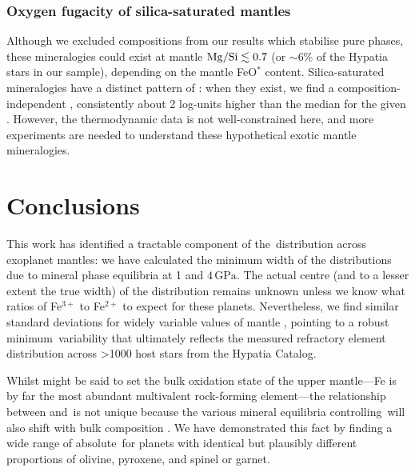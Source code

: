 \subsubsection{Oxygen fugacity of silica-saturated mantles}\label{sec:discussion-sio2}

Although we excluded compositions from our results which stabilise pure  phases, these mineralogies could exist at mantle ${\rm Mg/Si} \lesssim 0.7$ (or $\sim$6\% of the Hypatia stars in our sample), depending on the mantle FeO$^*$ content. %
Silica-saturated mineralogies have a distinct pattern of \fo: when they exist, we find a composition-independent \fo, consistently about 2 log-units higher than the median for the given \xfer. %
However, the thermodynamic data is not well-constrained here, and more experiments are needed to understand these hypothetical exotic mantle mineralogies.




\section{Conclusions}
\label{sec:fo2-conclusion}

This work has identified a tractable component of the \fo\,distribution across exoplanet mantles: we have calculated the minimum width of the distributions due to mineral phase equilibria at 1 and $4\,\text{GPa}$. The actual centre (and to a lesser extent the true width) of the distribution remains unknown unless we know what ratios of Fe$^{3+}$ to Fe$^{2+}$ to expect for these planets. Nevertheless, we find similar \fo\,standard deviations for widely variable values of mantle \xfer, pointing to a robust minimum \fo\,variability that ultimately reflects the measured refractory element distribution across \textgreater 1000 host stars from the Hypatia Catalog. 

Whilst \xfer\;might be said to set the bulk oxidation state of the upper mantle---Fe is by far the most abundant multivalent rock-forming element---the relationship between \xfer\;and \fo\,is not unique because the various mineral equilibria controlling \fo\,will also shift with bulk composition \citep{frost_introduction_1991}. We have demonstrated this fact by finding a wide range of absolute \fo\,for planets with identical \xfer\;but plausibly different proportions of olivine, pyroxene, and spinel or garnet.

